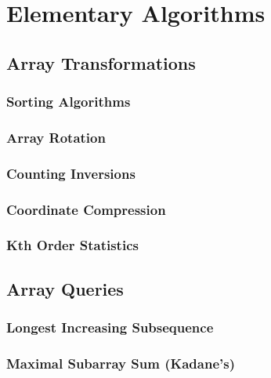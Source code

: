 \chapter{Elementary Algorithms}

\section{Array Transformations}
\setcounter{section}{1}
\setcounter{subsection}{0}
\subsection{Sorting Algorithms}

\subsection{Array Rotation}

\subsection{Counting Inversions}

\subsection{Coordinate Compression}

\subsection{Kth Order Statistics}


\section{Array Queries}
\setcounter{section}{2}
\setcounter{subsection}{0}
\subsection{Longest Increasing Subsequence}

\subsection{Maximal Subarray Sum (Kadane's)}

